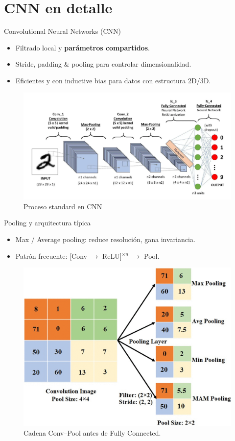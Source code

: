 \documentclass[8pt,spanish]{beamer}
\begin{document}
\section{CNN en detalle}
\begin{frame}{Convolutional Neural Networks (CNN)}
  \begin{itemize}
    \item Filtrado local y \textbf{parámetros compartidos}.  
    \item Stride, padding \& pooling para controlar dimensionalidad.
    \item Eficientes y con inductive bias para datos con estructura 2D/3D.
  \end{itemize}
  \begin{figure}
    \centering
    \includegraphics[width=.75\linewidth]{cnn.png}
    \caption{Proceso standard en CNN}
  \end{figure}
\end{frame}

\begin{frame}{Pooling y arquitectura típica}
  \begin{itemize}
    \item Max / Average pooling: reduce resolución, gana invariancia.
    \item Patrón frecuente: [Conv $\rightarrow$ ReLU]$^{\times n}$ $\rightarrow$ Pool.
  \end{itemize}
  \begin{figure}
    \centering
    \includegraphics[width=.7\linewidth]{maxpool.png}
    \caption{Cadena Conv–Pool antes de Fully Connected.}
  \end{figure}
\end{frame}
\end{document}
